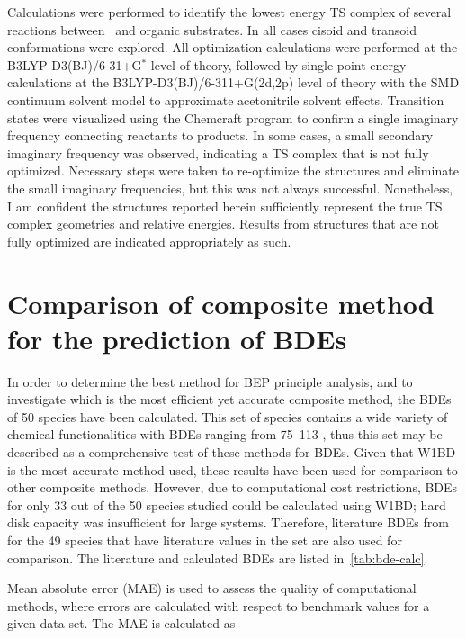 \begin{doublespace}
Calculations were performed to identify the lowest energy TS complex of several
reactions between \cumo\ and organic substrates. In all cases cisoid and
transoid conformations were explored. All optimization calculations were
performed at the B3LYP-D3(BJ)/6-31+G$^*$ level of theory, followed by
single-point energy calculations at the B3LYP-D3(BJ)/6-311+G(2d,2p) level of
theory with the SMD continuum solvent model\cite{Marenich2009} to approximate
acetonitrile solvent effects. Transition states were visualized using the
Chemcraft program\cite{ccraft} to confirm a single imaginary frequency
connecting reactants to products. In some cases, a small secondary imaginary
frequency was observed, indicating a TS complex that is not fully optimized.
Necessary steps were taken to re-optimize the structures and eliminate the small
imaginary frequencies, but this was not always successful. Nonetheless, I
am confident the structures reported herein sufficiently represent the true TS
complex geometries and relative energies. Results from structures that are not
fully optimized are indicated appropriately as such.

\section{Comparison of composite method for the prediction of BDEs}

In order to determine the best method for BEP principle analysis, and to
investigate which is the most efficient yet accurate composite method, the BDEs
of 50 species have been calculated. This set of species contains a wide variety
of chemical functionalities with BDEs ranging from 75--113 \kcalmol, thus this
set may be described as a comprehensive test of these methods for  BDEs.
Given that W1BD is the most accurate method used, these results have been used
for comparison to other composite methods. However, due to computational cost
restrictions, BDEs for only 33 out of the 50 species studied could be
calculated using W1BD; hard disk capacity was insufficient for large systems.
Therefore, literature BDEs from \citet{Luo2002} for the 49 species that have
literature values in the set are also used for comparison. The literature and
calculated BDEs are listed in~\ref{tab:bde-calc}.

\newpage



Mean absolute error (MAE) is used to assess the quality of computational
methods, where errors are calculated with respect to benchmark values for a
given data set.\cite{Savin2014} The MAE is calculated as


\end{doublespace}
